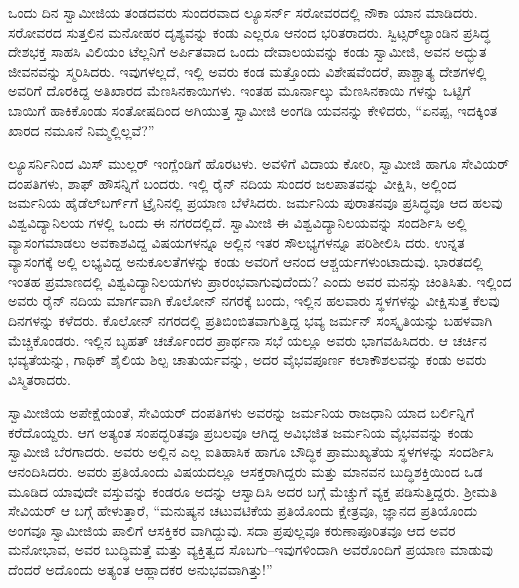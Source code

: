 ಒಂದು ದಿನ ಸ್ವಾಮೀಜಿಯ ತಂಡದವರು ಸುಂದರವಾದ ಲ್ಯೂಸರ್ನ್ ಸರೋವರದಲ್ಲಿ ನೌಕಾ ಯಾನ ಮಾಡಿದರು. ಸರೋವರದ ಸುತ್ತಲಿನ ಮನೋಹರ ದೃಶ್ಯವನ್ನು ಕಂಡು ಎಲ್ಲರೂ ಆನಂದ ಭರಿತರಾದರು. ಸ್ವಿಟ್ಸರ್​ಲ್ಯಾಂಡಿನ ಪ್ರಸಿದ್ಧ ದೇಶಭಕ್ತ ಸಾಹಸಿ ವಿಲಿಯಂ ಟೆಲ್ಲನಿಗೆ ಅರ್ಪಿತವಾದ ಒಂದು ದೇವಾಲಯವನ್ನು ಕಂಡು ಸ್ವಾಮೀಜಿ, ಅವನ ಅದ್ಭುತ ಜೀವನವನ್ನು ಸ್ಮರಿಸಿದರು. ಇವುಗಳಲ್ಲದೆ, ಇಲ್ಲಿ ಅವರು ಕಂಡ ಮತ್ತೊಂದು ವಿಶೇಷವೆಂದರೆ, ಪಾಶ್ಚಾತ್ಯ ದೇಶಗಳಲ್ಲಿ ಅವರಿಗೆ ದೊರಕಿದ್ದ ಅತಿಖಾರದ ಮೆಣಸಿನಕಾಯಿಗಳು. ಇಂತಹ ಮೂರ್ನಾಲ್ಕು ಮೆಣಸಿನಕಾಯಿ ಗಳನ್ನು ಒಟ್ಟಿಗೆ ಬಾಯಿಗೆ ಹಾಕಿಕೊಂಡು ಸಂತೋಷದಿಂದ ಅಗಿಯುತ್ತ ಸ್ವಾಮೀಜಿ ಅಂಗಡಿ ಯವನನ್ನು ಕೇಳಿದರು, “ಏನಪ್ಪ, ಇದಕ್ಕಿಂತ ಖಾರದ ನಮೂನೆ ನಿಮ್ಮಲ್ಲಿಲ್ಲವೆ?”

ಲ್ಯೂಸರ್ನಿನಿಂದ ಮಿಸ್ ಮುಲ್ಲರ್ ಇಂಗ್ಲೆಂಡಿಗೆ ಹೊರಟಳು. ಅವಳಿಗೆ ವಿದಾಯ ಕೋರಿ, ಸ್ವಾಮೀಜಿ ಹಾಗೂ ಸೇವಿಯರ್ ದಂಪತಿಗಳು, ಶಾಫ್ ಹೌಸನ್ನಿಗೆ ಬಂದರು. ಇಲ್ಲಿ ರೈನ್ ನದಿಯ ಸುಂದರ ಜಲಪಾತವನ್ನು ವೀಕ್ಷಿಸಿ, ಅಲ್ಲಿಂದ ಜರ್ಮನಿಯ ಹೈಡೆಲ್​ಬರ್ಗ್​ಗೆ ಟ್ರೈನಿನಲ್ಲಿ ಪ್ರಯಾಣ ಬೆಳೆಸಿದರು. ಜರ್ಮನಿಯ ಪುರಾತನವೂ ಪ್ರಸಿದ್ಧವೂ ಆದ ಹಲವು ವಿಶ್ವವಿದ್ಯಾನಿಲಯ ಗಳಲ್ಲಿ ಒಂದು ಈ ನಗರದಲ್ಲಿದೆ. ಸ್ವಾಮೀಜಿ ಈ ವಿಶ್ವವಿದ್ಯಾನಿಲಯವನ್ನು ಸಂದರ್ಶಿಸಿ ಅಲ್ಲಿ ವ್ಯಾಸಂಗಮಾಡಲು ಅವಕಾಶವಿದ್ದ ವಿಷಯಗಳನ್ನೂ ಅಲ್ಲಿನ ಇತರ ಸೌಲಭ್ಯಗಳನ್ನೂ ಪರಿಶೀಲಿಸಿ ದರು. ಉನ್ನತ ವ್ಯಾಸಂಗಕ್ಕೆ ಅಲ್ಲಿ ಲಭ್ಯವಿದ್ದ ಅನುಕೂಲತೆಗಳನ್ನು ಕಂಡು ಅವರಿಗೆ ಆನಂದ ಆಶ್ಚರ್ಯಗಳುಂಟಾದುವು. ಭಾರತದಲ್ಲಿ ಇಂತಹ ಪ್ರಮಾಣದಲ್ಲಿ ವಿಶ್ವವಿದ್ಯಾನಿಲಯಗಳು ಪ್ರಾರಂಭವಾಗುವುದೆಂದು? ಎಂದು ಅವರ ಮನಸ್ಸು ಚಿಂತಿಸಿತು. ಇಲ್ಲಿಂದ ಅವರು ರೈನ್ ನದಿಯ ಮಾರ್ಗವಾಗಿ ಕೊಲೋನ್ ನಗರಕ್ಕೆ ಬಂದು, ಇಲ್ಲಿನ ಹಲವಾರು ಸ್ಥಳಗಳನ್ನು ವೀಕ್ಷಿಸುತ್ತ ಕೆಲವು ದಿನಗಳನ್ನು ಕಳೆದರು. ಕೊಲೋನ್ ನಗರದಲ್ಲಿ ಪ್ರತಿಬಿಂಬಿತವಾಗುತ್ತಿದ್ದ ಭವ್ಯ ಜರ್ಮನ್ ಸಂಸ್ಕೃತಿಯನ್ನು ಬಹಳವಾಗಿ ಮೆಚ್ಚಿಕೊಂಡರು. ಇಲ್ಲಿನ ಬೃಹತ್ ಚರ್ಚೊಂದರ ಪ್ರಾರ್ಥನಾ ಸಭೆ ಯಲ್ಲೂ ಅವರು ಭಾಗವಹಿಸಿದರು. ಆ ಚರ್ಚಿನ ಭವ್ಯತೆಯನ್ನು, ಗಾಥಿಕ್ ಶೈಲಿಯ ಶಿಲ್ಪ ಚಾತುರ್ಯವನ್ನು, ಅದರ ವೈಭವಪೂರ್ಣ ಕಲಾಕೌಶಲವನ್ನು ಕಂಡು ಅವರು ವಿಸ್ಮಿತರಾದರು.

ಸ್ವಾಮೀಜಿಯ ಅಪೇಕ್ಷೆಯಂತೆ, ಸೇವಿಯರ್ ದಂಪತಿಗಳು ಅವರನ್ನು ಜರ್ಮನಿಯ ರಾಜಧಾನಿ ಯಾದ ಬರ್ಲಿನ್ನಿಗೆ ಕರೆದೊಯ್ದರು. ಆಗ ಅತ್ಯಂತ ಸಂಪದ್ಭರಿತವೂ ಪ್ರಬಲವೂ ಆಗಿದ್ದ ಅವಿಭಜಿತ ಜರ್ಮನಿಯ ವೈಭವವನ್ನು ಕಂಡು ಸ್ವಾಮೀಜಿ ಬೆರಗಾದರು. ಅವರು ಅಲ್ಲಿನ ಎಲ್ಲ ಐತಿಹಾಸಿಕ ಹಾಗೂ ಬೌದ್ಧಿಕ ಪ್ರಾಮುಖ್ಯತೆಯ ಸ್ಥಳಗಳನ್ನು ಸಂದರ್ಶಿಸಿ ಆನಂದಿಸಿದರು. ಅವರು ಪ್ರತಿಯೊಂದು ವಿಷಯದಲ್ಲೂ ಆಸಕ್ತರಾಗಿದ್ದರು ಮತ್ತು ಮಾನವನ ಬುದ್ಧಿಶಕ್ತಿಯಿಂದ ಒಡ ಮೂಡಿದ ಯಾವುದೇ ವಸ್ತುವನ್ನು ಕಂಡರೂ ಅದನ್ನು ಆಸ್ವಾದಿಸಿ ಅದರ ಬಗ್ಗೆ ಮೆಚ್ಚುಗೆ ವ್ಯಕ್ತ ಪಡಿಸುತ್ತಿದ್ದರು. ಶ್ರೀಮತಿ ಸೇವಿಯರ್ ಆ ಬಗ್ಗೆ ಹೇಳುತ್ತಾರೆ, “ಮನುಷ್ಯನ ಚಟುವಟಿಕೆಯ ಪ್ರತಿಯೊಂದು ಕ್ಷೇತ್ರವೂ, ಜ್ಞಾನದ ಪ್ರತಿಯೊಂದು ಅಂಗವೂ ಸ್ವಾಮೀಜಿಯ ಪಾಲಿಗೆ ಆಸಕ್ತಿಕರ ವಾಗಿದ್ದುವು. ಸದಾ ಪ್ರಪುಲ್ಲವೂ ಕರುಣಾಪೂರಿತವೂ ಆದ ಅವರ ಮನೋಭಾವ, ಅವರ ಬುದ್ಧಿಮತ್ತೆ ಮತ್ತು ವ್ಯಕ್ತಿತ್ವದ ಸೊಬಗು–ಇವುಗಳಿಂದಾಗಿ ಅವರೊಂದಿಗೆ ಪ್ರಯಾಣ ಮಾಡುವು ದೆಂದರೆ ಅದೊಂದು ಅತ್ಯಂತ ಆಹ್ಲಾದಕರ ಅನುಭವವಾಗಿತ್ತು!”

